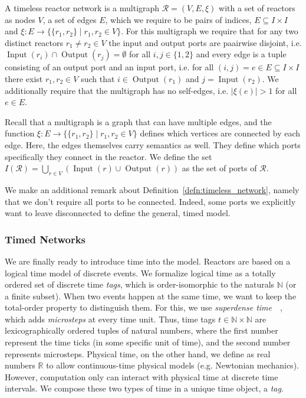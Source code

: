 \begin{defn}
    \label{defn:timeless_network}
A timeless reactor network is a multigraph $\mathcal{R} = (V,E,\xi)$ with a set of reactors as nodes $V$,
a set of edges $E$, which we require to be pairs of indices, $E \subseteq I \times I$ and $\xi : E \rightarrow \{ \{r_1, r_2\} \mid r_1, r_2 \in V \}$.
For this multigraph we require that for any two distinct reactors $r_1 \neq r_2 \in V$ the input and output ports are paairwise disjoint,
i.e. $\operatorname{Input}(r_i) \cap \operatorname{Output}(r_j) = \emptyset$ for all $i,j \in \{ 1, 2 \}$ and every edge is a tuple consisting of an output port and an input port,
i.e. for all $(i,j) = e \in E \subseteq I \times I$ there exist $r_1,r_2 \in V$ such that $i \in \operatorname{Output}(r_1)$ and $j = \operatorname{Input}(r_2)$.
We additionally require that the multigraph has no self-edges, i.e. $|\xi(e)| > 1$ for all $e \in E$.
\end{defn}

Recall that a multigraph is a graph that can have multiple edges, and the function $\xi : E \rightarrow \{ \{r_1, r_2\} \mid r_1, r_2 \in V \}$ defines which vertices are connected by each edge.
Here, the edges themselves carry semantics as well. They define which ports specifically they connect in the reactor.
We define the set $I(\mathcal{R}) = \bigcup_{r \in V}(\operatorname{Input}(r) \cup \operatorname{Output}(r))$ as the set of ports of $\mathcal{R}$.

We make an additional remark about Definition~\ref{defn:timeless_network}, namely that we don't require all ports to be connected.
Indeed, some ports we explicitly want to leave disconnected to define the general, timed model. 

\subsubsection{Timed Networks}

We are finally ready to introduce time into the model.
Reactors are based on a logical time model of discrete events.
We formalize logical time as a totally ordered set of discrete time \emph{tags}, which is order-isomorphic to the naturals $\mathbb{N}$ (or a finite subset). 
When two events happen at the same time, we want to keep the total-order property to distinguish them.
For this, we use \emph{superdense time}~\cite{superdense,Ptolemaeus:14:SystemDesign}~, which adds \emph{microsteps} at every time unit.
Thus, time tags $t \in \mathbb{N} \times \mathbb{N}$ are lexicographically ordered tuples of natural numbers, where the first number represent the time ticks (in some specific unit of time), and the second number represents microsteps.
Physical time, on the other hand, we define as real numbers $\mathbb{R}$ to allow continuous-time physical models (e.g. Newtonian mechanics).
However, computation only can interact with physical time at discrete time intervals.
We compose these two types of time in a unique time object, a \emph{tag}.

